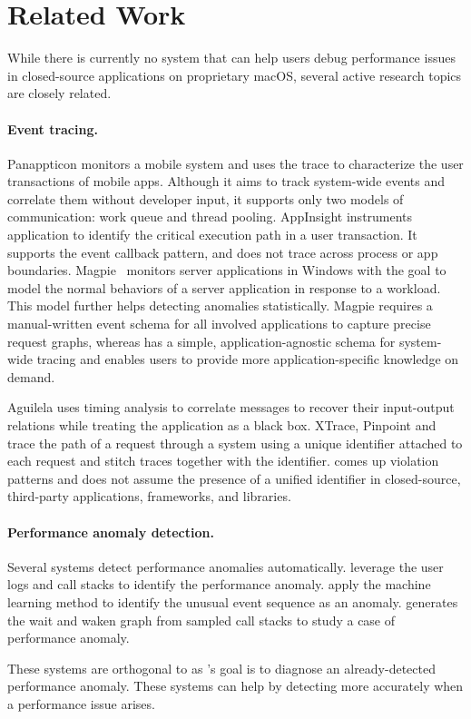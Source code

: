 \section{Related Work}
\label{sec:related-work}

While there is currently no system that can help users debug performance
issues in closed-source applications on proprietary macOS, several active
research topics are closely related.

\paragraph{Event tracing.}

Panappticon \cite{zhang2013panappticon} monitors a mobile system and uses the
trace to characterize the user transactions of mobile apps. Although it aims to
track system-wide events and correlate them without developer input, it supports
only two models of communication: work queue and thread pooling. AppInsight
\cite{ravindranath2012appinsight} instruments application to identify the
critical execution path in a user transaction. It supports the event callback
pattern, and does not trace across process or app boundaries.
Magpie~\cite{barham2004using} monitors server applications in Windows with the
goal to model the normal behaviors of a server application in response to a
workload. This model further helps detecting anomalies statistically. Magpie
requires a manual-written event schema for all involved applications to capture
precise request graphs, whereas \xxx has a simple, application-agnostic schema
for system-wide tracing and enables users to provide more application-specific
knowledge on demand.

Aguilela \cite{aguilera2003performance} uses timing analysis to correlate
messages to recover their input-output relations while treating the application
as a black box. XTrace, Pinpoint and \etc ~\cite{fonseca2007x, chen2002pinpoint,
chow2014mystery} trace the path of a request through a system using a unique
identifier attached to each request and stitch traces together with the
identifier. \xxx comes up violation patterns and does not assume the presence of
a unified identifier in closed-source, third-party applications, frameworks, and
libraries.


\paragraph{Performance anomaly detection.} Several systems detect performance
anomalies automatically. \cite{han2012performance, yuan2012conservative}
leverage the user logs and call stacks to identify the performance anomaly.
\cite{cohen2004correlating, saidi2008full, xu2009detecting, du2017deeplog}
apply the machine learning method to identify the unusual event sequence as an
anomaly. \cite{yu2014comprehending} generates the wait and waken graph from
sampled call stacks to study a case of performance anomaly.

These systems are orthogonal to \xxx as \xxx's goal is to diagnose an
already-detected performance anomaly. These systems can help \xxx by detecting
more accurately when a performance issue arises.
